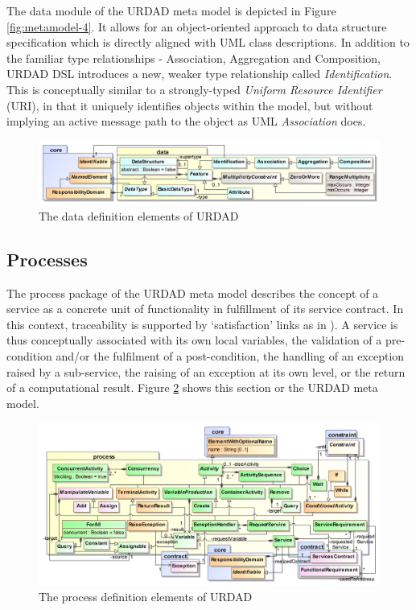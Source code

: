 {The data module of the URDAD meta model is depicted in Figure \ref{fig:metamodel-4}. It allows for an object-oriented approach to data structure specification which is directly aligned with UML class descriptions. In addition to the familiar type relationships - Association, Aggregation and Composition, URDAD DSL introduces a new, weaker type relationship called \emph{Identification}. This is conceptually similar to a strongly-typed \emph{Uniform Resource Identifier} (URI), in that it uniquely identifies objects within the model, but without implying an active message path to the object as UML \emph{Association} does.
 
\begin{figure}[Htbp]
  \centering
  \includegraphics{data}
  \caption{The data definition elements of URDAD}
  \label{fig:dataStructureModule}
\end{figure}

\subsection{Processes}

The process package of the URDAD meta model describes the concept of a service as a concrete unit of functionality in fulfillment of its service contract. In this context, traceability is supported by `satisfaction' links as in \cite{ramesh_toward_2001}). A service is thus conceptually associated with its own local variables, the validation of a pre-condition and/or the fulfilment of a post-condition, the handling of an exception raised by a sub-service, the raising of an exception at its own level, or the return of a computational result. Figure \ref{fig:processModule} shows this section or the URDAD meta model.
\begin{figure}[Htbp]
  \centering
  \includegraphics{process}
  \caption{The process definition elements of URDAD}
  \label{fig:processModule}
\end{figure}

}
